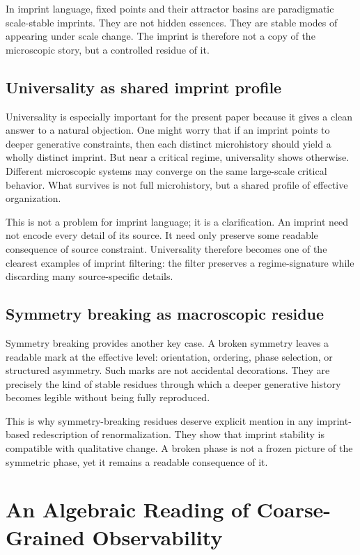 \documentclass[12pt,a4paper]{article}
\begin{document}
In imprint language, fixed points and their attractor basins are paradigmatic scale-stable imprints. They are not hidden essences. They are stable modes of appearing under scale change. The imprint is therefore not a copy of the microscopic story, but a controlled residue of it.

\subsection{Universality as shared imprint profile}

Universality is especially important for the present paper because it gives a clean answer to a natural objection. One might worry that if an imprint points to deeper generative constraints, then each distinct microhistory should yield a wholly distinct imprint. But near a critical regime, universality shows otherwise. Different microscopic systems may converge on the same large-scale critical behavior. What survives is not full microhistory, but a shared profile of effective organization.

This is not a problem for imprint language; it is a clarification. An imprint need not encode every detail of its source. It need only preserve some readable consequence of source constraint. Universality therefore becomes one of the clearest examples of imprint filtering: the filter preserves a regime-signature while discarding many source-specific details.

\subsection{Symmetry breaking as macroscopic residue}

Symmetry breaking provides another key case. A broken symmetry leaves a readable mark at the effective level: orientation, ordering, phase selection, or structured asymmetry. Such marks are not accidental decorations. They are precisely the kind of stable residues through which a deeper generative history becomes legible without being fully reproduced.

This is why symmetry-breaking residues deserve explicit mention in any imprint-based redescription of renormalization. They show that imprint stability is compatible with qualitative change. A broken phase is not a frozen picture of the symmetric phase, yet it remains a readable consequence of it.

\section{An Algebraic Reading of Coarse-Grained Observability}
\end{document}
